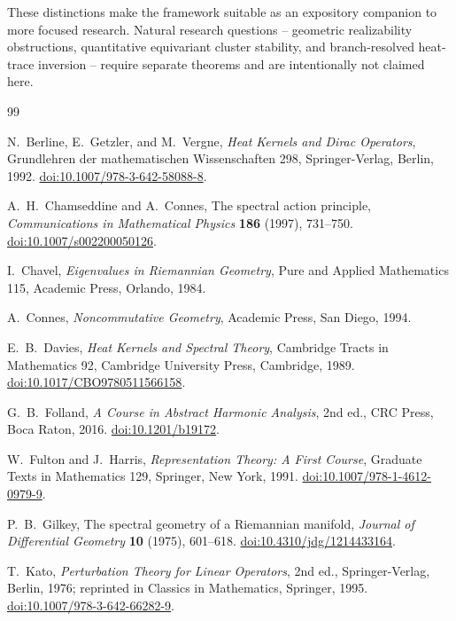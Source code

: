 \documentclass[11pt,a4paper]{article}
\theoremstyle{definition}
\theoremstyle{remark}
\begin{document}
These distinctions make the framework suitable as an expository companion to
more focused research. Natural research questions -- geometric realizability
obstructions, quantitative equivariant cluster stability, and branch-resolved
heat-trace inversion -- require separate theorems and are intentionally not
claimed here.

\begin{thebibliography}{99}

N.~Berline, E.~Getzler, and M.~Vergne,
\emph{Heat Kernels and Dirac Operators},
Grundlehren der mathematischen Wissenschaften 298,
Springer-Verlag, Berlin, 1992.
\href{https://doi.org/10.1007/978-3-642-58088-8}
{doi:10.1007/978-3-642-58088-8}.

A.~H.~Chamseddine and A.~Connes,
The spectral action principle,
\emph{Communications in Mathematical Physics} \textbf{186} (1997), 731--750.
\href{https://doi.org/10.1007/s002200050126}{doi:10.1007/s002200050126}.

I.~Chavel,
\emph{Eigenvalues in Riemannian Geometry},
Pure and Applied Mathematics 115,
Academic Press, Orlando, 1984.

A.~Connes,
\emph{Noncommutative Geometry},
Academic Press, San Diego, 1994.

E.~B.~Davies,
\emph{Heat Kernels and Spectral Theory},
Cambridge Tracts in Mathematics 92,
Cambridge University Press, Cambridge, 1989.
\href{https://doi.org/10.1017/CBO9780511566158}{doi:10.1017/CBO9780511566158}.

G.~B.~Folland,
\emph{A Course in Abstract Harmonic Analysis},
2nd ed., CRC Press, Boca Raton, 2016.
\href{https://doi.org/10.1201/b19172}{doi:10.1201/b19172}.

W.~Fulton and J.~Harris,
\emph{Representation Theory: A First Course},
Graduate Texts in Mathematics 129, Springer, New York, 1991.
\href{https://doi.org/10.1007/978-1-4612-0979-9}
{doi:10.1007/978-1-4612-0979-9}.

P.~B.~Gilkey,
The spectral geometry of a Riemannian manifold,
\emph{Journal of Differential Geometry} \textbf{10} (1975), 601--618.
\href{https://doi.org/10.4310/jdg/1214433164}{doi:10.4310/jdg/1214433164}.

T.~Kato,
\emph{Perturbation Theory for Linear Operators},
2nd ed., Springer-Verlag, Berlin, 1976; reprinted in Classics in Mathematics,
Springer, 1995.
\href{https://doi.org/10.1007/978-3-642-66282-9}
{doi:10.1007/978-3-642-66282-9}.


\end{thebibliography}
\end{document}
